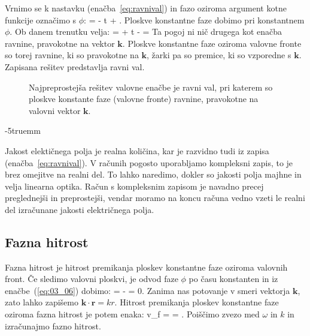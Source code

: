 Vrnimo se k nastavku (enačba~\ref{eq:ravnival}) in fazo oziroma
argument kotne funkcije označimo s $\phi$:
\beq
\phi = \cdot {} - \omega t + \delta.
\label{eq:03_06}
\eeq
Ploskve konstantne faze dobimo pri konstantnem $\phi$. Ob danem trenutku velja:
\beq
{}\cdot {} = \phi + \omega t - \delta = 
\label{eq:03_08}
\eeq
Ta pogoj ni nič drugega kot enačba ravnine, pravokotne na vektor $\mathbf{k}$. Ploskve konstantne faze
oziroma valovne fronte so torej ravnine, ki so pravokotne na $\mathbf{k}$, žarki pa so premice, ki 
so vzporedne s $\mathbf{k}$. Zapisana rešitev predstavlja ravni val.
\begin{figure}[ht]
\centering
\def\svgwidth{90truemm} 

\caption{Najpreprostejša rešitev valovne enačbe je ravni val, pri katerem so ploskve konstante
faze (valovne fronte) ravnine, pravokotne na valovni vektor $\mathbf{k}$.}
\label{fig:03_ravnival}
\end{figure}
\vglue-5truemm
\begin{remark}
Jakost elektičnega polja je realna količina, kar je razvidno tudi iz zapisa (enačba~\ref{eq:ravnival}). 
V računih pogosto uporabljamo kompleksni zapis, to je brez omejitve na realni del. To lahko 
naredimo, dokler so jakosti polja majhne in velja linearna optika. Račun s kompleksnim zapisom
je navadno precej preglednejši in preprostejši, vendar moramo na koncu računa vedno vzeti le
realni del izračunane jakosti električnega polja. 
\end{remark}

\subsection*{Fazna hitrost}
Fazna hitrost je hitrost premikanja ploskev konstantne faze oziroma valovnih front. 
Če sledimo valovni ploskvi, je odvod faze $\phi$ po času konstanten in iz enačbe~(\ref{eq:03_06}) 
dobimo:
\beq
{}= \cdot {} - \omega = 0.
\label{eq:03_09}
\eeq
Zanima nas potovanje v smeri vektorja $\mathbf{k}$, 
zato lahko zapišemo $\mathbf{k}\cdot \mathbf{r} = kr$. Hitrost premikanja ploskev
konstantne faze oziroma fazna hitrost je potem enaka:
\beq
v_f =  = .
\label{eq:03_10}
\eeq
Poiščimo zvezo med $\omega$ in $k$ in izračunajmo fazno hitrost.

